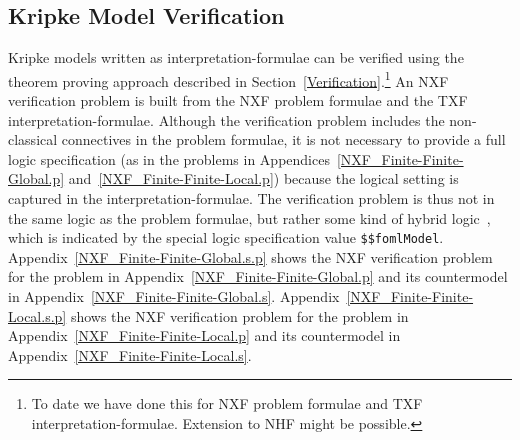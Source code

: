\documentclass{easychair}
\begin{document}
\subsection{Kripke Model Verification}
\label{KripkeVerification}

Kripke models written as interpretation-formulae can be verified using the theorem proving 
approach described in Section~\ref{Verification}.\footnote{%
To date we have done this for NXF problem formulae and TXF interpretation-formulae. 
Extension to NHF might be possible.}
An NXF verification problem is built from the NXF problem formulae and the TXF 
interpretation-formulae.
Although the verification problem includes the non-classical connectives in the problem
formulae, it is not necessary to provide a full logic specification (as in the problems in
Appendices~\ref{NXF_Finite-Finite-Global.p} and~\ref{NXF_Finite-Finite-Local.p}) because the
logical setting is captured in the interpretation-formulae.
The verification problem is thus not in the same logic as the problem formulae, but rather
some kind of hybrid logic~\cite{Bra11}, which is indicated by the special logic specification
value {\tt \$\$fomlModel}.
Appendix~\ref{NXF_Finite-Finite-Global.s.p} shows the NXF verification problem for the problem
in Appendix~\ref{NXF_Finite-Finite-Global.p} and its countermodel in
Appendix~\ref{NXF_Finite-Finite-Global.s}.
Appendix~\ref{NXF_Finite-Finite-Local.s.p} shows the NXF verification problem for the problem
in Appendix~\ref{NXF_Finite-Finite-Local.p} and its countermodel in
Appendix~\ref{NXF_Finite-Finite-Local.s}.
\end{document}
